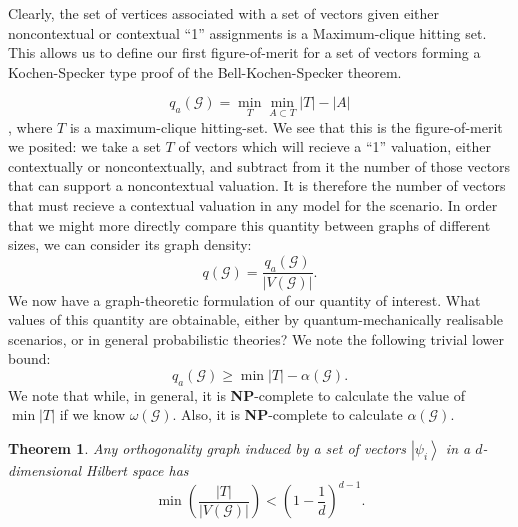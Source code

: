 \documentclass{amsart}
\newtheorem{thm}{Theorem}
\theoremstyle{definition}
\newcommand{\ket}[1]{{\left\vert{#1}\right\rangle}}
\begin{document}
Clearly, the set of vertices associated with a set of vectors given either noncontextual or contextual ``1'' assignments is a Maximum-clique hitting set. This allows us to define our first figure-of-merit for a set of vectors forming a Kochen-Specker type proof of the Bell-Kochen-Specker theorem.

\begin{equation}q_a(\mathcal{G})=\min_T \min_{A\subset T} |T|-|A|\end{equation},
where $T$ is a maximum-clique hitting-set. We see that this is the figure-of-merit we posited: we take a set $T$ of vectors which will recieve a ``1'' valuation, either contextually or noncontextually, and subtract from it the number of those vectors that can support a noncontextual valuation. It is therefore the number of vectors that must recieve a contextual valuation in any model for the scenario. In order that we might more directly compare this quantity between graphs of different sizes, we can consider its graph density:
\begin{equation}
q(\mathcal{G})=\frac{q_a(\mathcal{G})}{|V(\mathcal{G})|}.
\end{equation}
We now have a graph-theoretic formulation of our quantity of interest. What values of this quantity are obtainable, either by quantum-mechanically realisable scenarios, or in general probabilistic theories? We note the following trivial lower bound:
\begin{equation}
q_a(\mathcal{G})\geq \min |T|-\alpha(\mathcal{G}).
\end{equation}
We note that while, in general, it is \textbf{NP}-complete to calculate the value of $\min |T|$ if we know $\omega(\mathcal{G})$. Also, it is \textbf{NP}-complete to calculate $\alpha(\mathcal{G})$. %
\begin{thm}
Any orthogonality graph induced by a set of vectors $\ket{\psi_i}$ in a $d$-dimensional Hilbert space has
\begin{equation}
\min \left(\frac{|T|}{|V(\mathcal{G})|}\right) < \left(1-\frac1d\right)^{d-1}.
\end{equation}
\end{thm}
\end{document}
